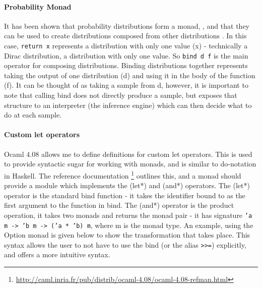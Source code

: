 \paragraph{Probability Monad}
It has been shown that probability distributions form a monad, \cite{giry1982categorical, jones1989probabilistic}, and that they can be used to create distributions composed from other distributions \cite{ramsey2002stochastic}. In this case, \texttt{return x} represents a distribution with only one value (x) - technically a Dirac distribution, a distribution with only one value. So \texttt{bind d f} is the main operator for composing distributions. Binding distributions together represents taking the output of one distribution (d) and using it in the body of the function (f). It can be thought of as taking a sample from d, however, it is important to note that calling bind does not directly produce a sample, but exposes that structure to an interpreter (the inference engine) which can then decide what to do at each sample.
	
	
\paragraph{Custom let operators}
Ocaml 4.08 allows me to define definitions for custom let operators. This is used to provide syntactic sugar for working with monads, and is similar to do-notation in Haskell. The reference documentation \footnote{\url{http://caml.inria.fr/pub/distrib/ocaml-4.08/ocaml-4.08-refman.html}} outlines this, and a monad should provide a module which implements the (let*) and (and*) operators. The (let*) operator is the standard bind function - it takes the identifier bound to as the first argument to the function in bind. The (and*) operator is the product operation, it takes two monads and returns the monad pair - it has signature \texttt{'a m -> 'b m -> ('a * 'b) m}, where m is the monad type. An example, using the Option monad is given below to show the transformation that takes place. This syntax allows the user to not have to use the bind (or the alias \texttt{>>=}) explicitly, and offers a more intuitive syntax.
	
